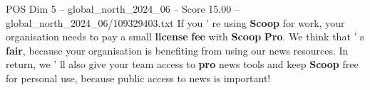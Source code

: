 \begin{textsample}{POS Dim 5 – global\_north\_2024\_06 – Score 15.00 – global\_north\_2024\_06/109329403.txt}
If you ' re using \textbf{Scoop} for work, your organisation needs to pay a small \textbf{license} \textbf{fee} with \textbf{Scoop} \textbf{Pro}.
We think that ' s \textbf{fair}, because your organisation is benefiting from using our news resources.
In return, we ' ll also give your team access to \textbf{pro} news tools and keep \textbf{Scoop} free for personal use, because public access to news is important!

\end{textsample}
